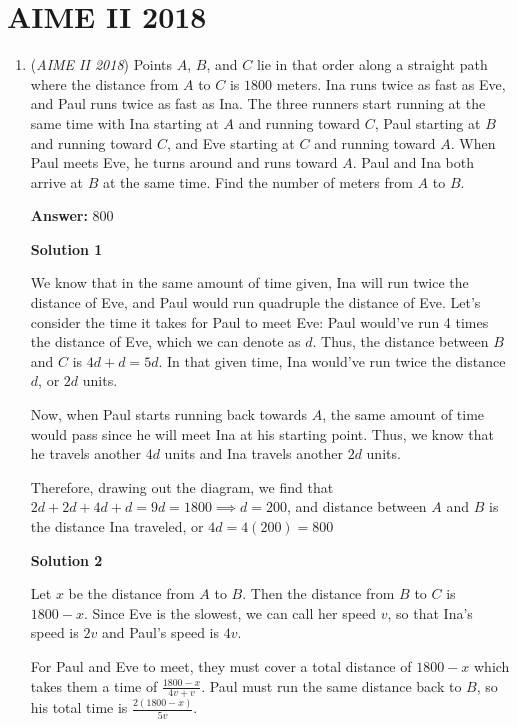 \section{AIME II 2018}
        \begin{enumerate}
        	\item (\textit{AIME II 2018}) Points $A$, $B$, and $C$ lie in that order along a straight path where the distance from $A$ to $C$ is $1800$ meters. Ina runs twice as fast as Eve, and Paul runs twice as fast as Ina. The three runners start running at the same time with Ina starting at $A$ and running toward $C$, Paul starting at $B$ and running toward $C$, and Eve starting at $C$ and running toward $A$. When Paul meets Eve, he turns around and runs toward $A$. Paul and Ina both arrive at $B$ at the same time. Find the number of meters from $A$ to $B$.


 
 \textbf{Answer: }800



\textbf{Solution 1}

We know that in the same amount of time given, Ina will run twice the distance of Eve, and Paul would run quadruple the distance of Eve. Let's consider the time it takes for Paul to meet Eve: Paul would've run 4 times the distance of Eve, which we can denote as $d$. Thus, the distance between $B$ and $C$ is $4d+d=5d$. In that given time, Ina would've run twice the distance $d$, or $2d$ units. 

 Now, when Paul starts running back towards $A$, the same amount of time would pass since he will meet Ina at his starting point. Thus, we know that he travels another $4d$ units and Ina travels another $2d$ units. 

 Therefore, drawing out the diagram, we find that $2d+2d+4d+d=9d=1800 \implies d=200$, and distance between $A$ and $B$ is the distance Ina traveled, or $4d=4(200)=\boxed{800}$




\textbf{Solution 2}

Let $x$ be the distance from $A$ to $B$. Then the distance from $B$ to $C$ is $1800-x$. Since Eve is the slowest, we can call her speed $v$, so that Ina's speed is $2v$ and Paul's speed is $4v$. 

 For Paul and Eve to meet, they must cover a total distance of $1800-x$ which takes them a time of $\frac{1800-x}{4v+v}$. Paul must run the same distance back to $B$, so his total time is $\frac{2(1800-x)}{5v}$. 


\end{enumerate}

